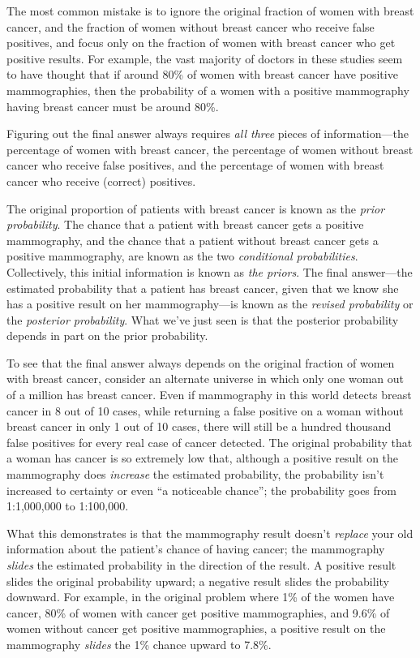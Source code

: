 {
 The most common mistake is to ignore the original fraction of
women with breast cancer, and the fraction of women without breast
cancer who receive false positives, and focus only on the fraction of
women with breast cancer who get positive results. For example, the
vast majority of doctors in these studies seem to have thought that if
around 80\% of women with breast cancer have positive mammographies,
then the probability of a women with a positive mammography having
breast cancer must be around 80\%.}

{
 Figuring out the final answer always requires \textit{all three}
pieces of information---the percentage of women with breast cancer, the
percentage of women without breast cancer who receive false positives,
and the percentage of women with breast cancer who receive (correct)
positives.}

{
 The original proportion of patients with breast cancer is known as
the \textit{prior probability}. The chance that a patient with breast
cancer gets a positive mammography, and the chance that a patient
without breast cancer gets a positive mammography, are known as the two
\textit{conditional probabilities}. Collectively, this initial
information is known as \textit{the priors}. The final answer---the
estimated probability that a patient has breast cancer, given that we
know she has a positive result on her mammography---is known as the
\textit{revised probability} or the \textit{posterior probability}.
What we've just seen is that the posterior probability
depends in part on the prior probability.}

{
 To see that the final answer always depends on the original
fraction of women with breast cancer, consider an alternate universe in
which only one woman out of a million has breast cancer. Even if
mammography in this world detects breast cancer in 8 out of 10 cases,
while returning a false positive on a woman without breast cancer in
only 1 out of 10 cases, there will still be a hundred thousand false
positives for every real case of cancer detected. The original
probability that a woman has cancer is so extremely low that, although
a positive result on the mammography does \textit{increase} the
estimated probability, the probability isn't increased
to certainty or even ``a noticeable
chance''; the probability goes from 1:1,000,000 to
1:100,000.}

{
 What this demonstrates is that the mammography result
doesn't \textit{replace} your old information about the
patient's chance of having cancer; the mammography
\textit{slides} the estimated probability in the direction of the
result. A positive result slides the original probability upward; a
negative result slides the probability downward. For example, in the
original problem where 1\% of the women have cancer, 80\% of women with
cancer get positive mammographies, and 9.6\% of women without cancer
get positive mammographies, a positive result on the mammography
\textit{slides} the 1\% chance upward to 7.8\%.}

